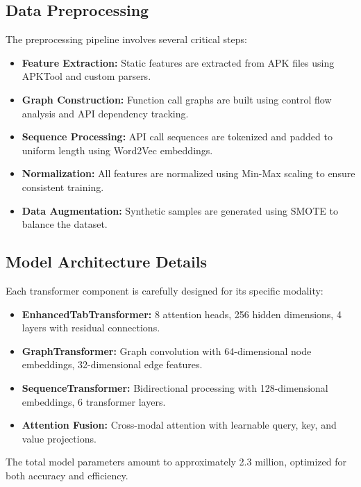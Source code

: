 \documentclass[10pt,conference]{IEEEtran}
\begin{document}
\subsection{Data Preprocessing}
The preprocessing pipeline involves several critical steps:

\begin{itemize}
    \item \textbf{Feature Extraction:} Static features are extracted from APK files using APKTool and custom parsers.
    \item \textbf{Graph Construction:} Function call graphs are built using control flow analysis and API dependency tracking.
    \item \textbf{Sequence Processing:} API call sequences are tokenized and padded to uniform length using Word2Vec embeddings.
    \item \textbf{Normalization:} All features are normalized using Min-Max scaling to ensure consistent training.
    \item \textbf{Data Augmentation:} Synthetic samples are generated using SMOTE to balance the dataset.
\end{itemize}

\subsection{Model Architecture Details}
Each transformer component is carefully designed for its specific modality:

\begin{itemize}
    \item \textbf{EnhancedTabTransformer:} 8 attention heads, 256 hidden dimensions, 4 layers with residual connections.
    \item \textbf{GraphTransformer:} Graph convolution with 64-dimensional node embeddings, 32-dimensional edge features.
    \item \textbf{SequenceTransformer:} Bidirectional processing with 128-dimensional embeddings, 6 transformer layers.
    \item \textbf{Attention Fusion:} Cross-modal attention with learnable query, key, and value projections.
\end{itemize}

The total model parameters amount to approximately 2.3 million, optimized for both accuracy and efficiency.
\end{document}
